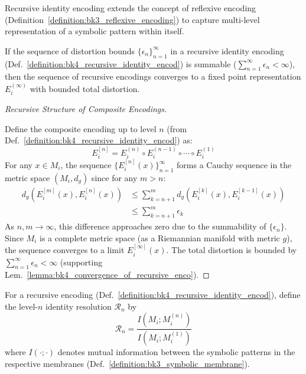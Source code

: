 Recursive identity encoding extends the concept of reflexive encoding (Definition~\ref{definition:bk3_reflexive_encoding}) to capture multi-level representation of a symbolic pattern within itself.
\begin{lemma} \label{lemma:bk4_convergence_of_recursive_enco}
If the sequence of distortion bounds $\{\epsilon_n\}_{n=1}^{\infty}$ in a recursive identity encoding (Def.~\ref{definition:bk4_recursive_identity_encod}) is summable ($\sum_{n=1}^{\infty} \epsilon_n < \infty$), then the sequence of recursive encodings converges to a fixed point representation $E_i^{(\infty)}$ with bounded total distortion.
\end{lemma}
\begin{proof}[Recursive Structure of Composite Encodings]
\label{proof:bk4_recursive_composite_encoding}
\leavevmode

Define the composite encoding up to level $n$ (from Def.~\ref{definition:bk4_recursive_identity_encod}) as:
\begin{equation}
    E_i^{[n]} = E_i^{(n)} \circ E_i^{(n-1)} \circ \cdots \circ E_i^{(1)} \label{eq:bk4_composite_encoding_proof}
\end{equation}
For any $x \in M_i$, the sequence $\{E_i^{[n]}(x)\}_{n=1}^{\infty}$ forms a Cauchy sequence in the metric space $(M_i, d_g)$ since for any $m > n$:
\begin{align}
    d_g(E_i^{[m]}(x), E_i^{[n]}(x)) &\leq \sum_{k=n+1}^{m} d_g(E_i^{[k]}(x), E_i^{[k-1]}(x)) \label{eq:bk4_cauchy_sum_epsilon_proof_step1} \\
    &\leq \sum_{k=n+1}^{m} \epsilon_k \label{eq:bk4_cauchy_sum_epsilon_proof_step2}
\end{align}
As $n, m \to \infty$, this difference approaches zero due to the summability of $\{\epsilon_n\}$. Since $M_i$ is a complete metric space (as a Riemannian manifold with metric $g$), the sequence converges to a limit $E_i^{[\infty]}(x)$. The total distortion is bounded by $\sum_{n=1}^{\infty} \epsilon_n < \infty$ (supporting Lem.~\ref{lemma:bk4_convergence_of_recursive_enco}).
\end{proof}
\begin{definition} \label{definition:bk4_identity_resolution}
For a recursive encoding (Def.~\ref{definition:bk4_recursive_identity_encod}),
define the level-$n$ identity resolution $\mathcal{R}_n$ by
\begin{equation}
    \mathcal{R}_n = \frac{I(M_i; M_i^{(n)})}{I(M_i; M_i^{(1)})} \label{eq:bk4_identity_resolution_formula_def}
\end{equation}
where $I(\cdot;\cdot)$ denotes mutual information between the symbolic patterns in the respective membranes (Def.~\ref{definition:bk3_symbolic_membrane}).
\end{definition}
